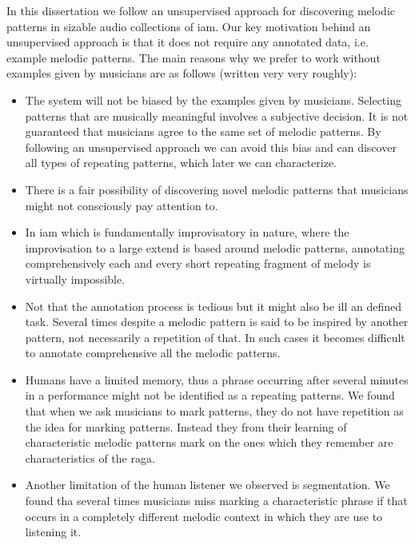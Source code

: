 In this dissertation we follow an unsupervised approach for discovering melodic patterns in sizable audio collections of \gls{iam}. Our key motivation behind an unsupervised approach is that it does not require any annotated data, i.e. example melodic patterns. The main reasons why we prefer to work without examples given by musicians are as follows (written very very roughly):
\begin{itemize}
	\item The system will not be biased by the examples given by musicians. Selecting patterns that are musically meaningful involves a subjective decision. It is not guaranteed that musicians agree to the same set of melodic patterns. By following an unsupervised approach we can avoid this bias and can discover all types of repeating patterns, which later we can characterize.
	\item There is a fair possibility of discovering novel melodic patterns that musicians might not consciously pay attention to. 
	\item In \gls{iam} which is fundamentally improvisatory in nature, where the improvisation to a large extend is based around melodic patterns, annotating comprehensively each and every short repeating fragment of melody is virtually impossible.
	\item Not that the annotation process is tedious but it might also be ill an defined task. Several times despite a melodic pattern is said to be inspired by another pattern, not necessarily a repetition of that. In such cases it becomes difficult to annotate comprehensive all the melodic patterns. 
	\item Humans have a limited memory, thus a phrase occurring after several minutes in a performance might not be identified as a repeating patterns. We found that when we ask musicians to mark patterns, they do not have repetition as the idea for marking patterns. Instead they from their learning of characteristic melodic patterns mark on the ones which they remember are characteristics of the \gls{raga}.
	\item Another limitation of the  human listener we observed is segmentation. We found tha several times musicians miss marking a characteristic phrase if that occurs in a completely different melodic context in which they are use to listening it.  
\end{itemize}


